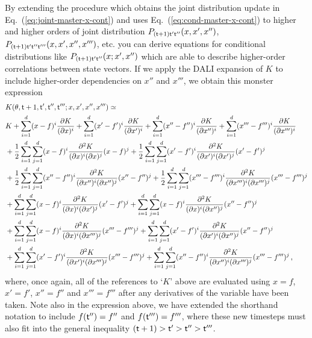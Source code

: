 By extending the procedure which obtains the joint distribution update in Eq.~(\ref{eq:joint-master-x-cont}) and uses Eq.~(\ref{eq:cond-master-x-cont}) to higher and higher orders of joint distribution $P_{({\sf t}+1){\sf t}'{\sf t}''}(x, x', x'')$, $P_{({\sf t}+1){\sf t}'{\sf t}''{\sf t}'''}(x, x', x'', x''')$, etc. you can derive equations for conditional distributions like $P_{({\sf t}+1){\sf t}'{\sf t}''}(x; x', x'')$ which are able to describe higher-order correlations between state vectors. If we apply the DALI expansion of $K$ to include higher-order dependencies on $x''$ and $x'''$, we obtain this monster expression
\begin{align}
& K(\theta , {\sf t}+1, {\sf t}', {\sf t}'', {\sf t}'''; x,x',x'',x''') \simeq \nonumber \\
& K + \sum_{i=1}^d(x-f)^i\frac{\partial K}{(\partial x)^i} + \sum_{i=1}^d(x'-f')^i\frac{\partial K}{(\partial x')^i} + \sum_{i=1}^d(x''-f'')^i\frac{\partial K}{(\partial x'')^i} + \sum_{i=1}^d(x'''-f''')^i\frac{\partial K}{(\partial x''')^i} \nonumber \\
& + \frac{1}{2}\sum_{i=1}^d\sum_{j=1}^d (x-f)^i\frac{\partial^2 K}{(\partial x)^i(\partial x)^j}(x-f)^j + \frac{1}{2}\sum_{i=1}^d\sum_{j=1}^d (x'-f')^i\frac{\partial^2 K}{(\partial x')^i(\partial x')^j}(x'-f')^j \nonumber \\
&+ \frac{1}{2}\sum_{i=1}^d\sum_{j=1}^d (x''-f'')^i\frac{\partial^2 K}{(\partial x'')^i(\partial x'')^j}(x''-f'')^j + \frac{1}{2}\sum_{i=1}^d\sum_{j=1}^d (x'''-f''')^i\frac{\partial^2 K}{(\partial x''')^i(\partial x''')^j}(x'''-f''')^j \nonumber \\
&+ \sum_{i=1}^d\sum_{j=1}^d (x-f)^i\frac{\partial^2 K}{(\partial x)^i(\partial x')^j}(x'-f')^j + \sum_{i=1}^d\sum_{j=1}^d (x-f)^i\frac{\partial^2 K}{(\partial x)^i(\partial x'')^j}(x''-f'')^j \nonumber \\
&+ \sum_{i=1}^d\sum_{j=1}^d (x-f)^i\frac{\partial^2 K}{(\partial x)^i(\partial x''')^j}(x'''-f''')^j + \sum_{i=1}^d\sum_{j=1}^d (x'-f')^i\frac{\partial^2 K}{(\partial x')^i(\partial x'')^j}(x''-f'')^j \nonumber \\
&+ \sum_{i=1}^d\sum_{j=1}^d (x'-f')^i\frac{\partial^2 K}{(\partial x')^i(\partial x''')^j}(x'''-f''')^j + \sum_{i=1}^d\sum_{j=1}^d (x''-f'')^i\frac{\partial^2 K}{(\partial x'')^i(\partial x''')^j}(x'''-f''')^j \label{eq:dali-covariance-higher}\,,
\end{align}
where, once again, all of the references to `$K$' above are evaluated using $x=f$, $x'=f'$, $x''=f''$ and $x'''=f'''$ after any derivatives of the variable have been taken. Note also in the expression above, we have extended the shorthand notation to include $f({\sf t}'')=f''$ and $f({\sf t}''')=f'''$, where these new timesteps must also fit into the general inequality $({\sf t}+1)>{\sf t}'>{\sf t}''>{\sf t}'''$.

